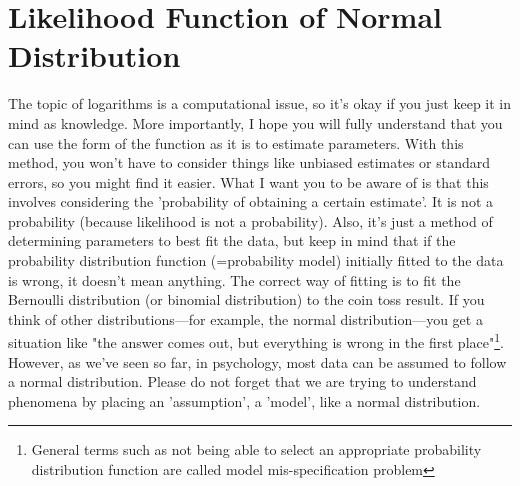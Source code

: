 \documentclass{ltjsbook}
\begin{document}
\section{Likelihood Function of Normal Distribution}
The topic of logarithms is a computational issue, so it's okay if you just keep it in mind as knowledge. More importantly, I hope you will fully understand that you can use the form of the function as it is to estimate parameters. With this method, you won't have to consider things like unbiased estimates or standard errors, so you might find it easier. What I want you to be aware of is that this involves considering the 'probability of obtaining a certain estimate'.
It is not a probability (because likelihood is not a probability). Also, it's just a method of determining parameters to best fit the data, but keep in mind that if the probability distribution function (=probability model) initially fitted to the data is wrong, it doesn't mean anything. The correct way of fitting is to fit the Bernoulli distribution (or binomial distribution) to the coin toss result. If you think of other distributions—for example, the normal distribution—you get a situation like "the answer comes out, but everything is wrong in the first place"\footnote{General terms such as not being able to select an appropriate probability distribution function are called model mis-specification problem}. However, as we've seen so far, in psychology, most data can be assumed to follow a normal distribution. Please do not forget that we are trying to understand phenomena by placing an 'assumption', a 'model', like a normal distribution.
\end{document}
